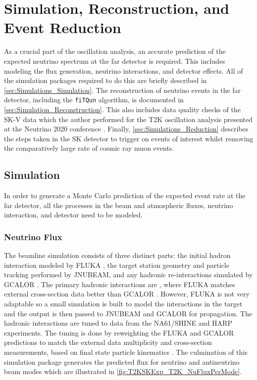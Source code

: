 \chapter{Simulation, Reconstruction, and Event Reduction}
\label{chap:Simulations}

As a crucial part of the oscillation analysis, an accurate prediction of the expected neutrino spectrum at the far detector is required. This includes modeling the flux generation, neutrino interactions, and detector effects. All of the simulation packages required to do this are briefly described in \autoref{sec:Simulations_Simulation}. The reconstruction of neutrino events in the far detector, including the \texttt{fiTQun} algorithm, is documented in \autoref{sec:Simulation_Reconstruction}. This also includes data quality checks of the SK-V data which the author performed for the T2K oscillation analysis presented at the Neutrino 2020 conference \cite{Dunne2020-uf}. Finally, \autoref{sec:Simulations_Reduction} describes the steps taken in the SK detector to trigger on events of interest whilst removing the comparatively large rate of cosmic ray muon events.

\section{Simulation}
\label{sec:Simulations_Simulation}

In order to generate a Monte Carlo prediction of the expected event rate at the far detector, all the processes in the beam and atmospheric fluxes, neutrino interaction, and detector need to be modeled. %

\subsection{Neutrino Flux}

The beamline simulation consists of three distinct parts: the initial hadron interaction modeled by FLUKA \cite{fluka2011}, the target station geometry and particle tracking performed by JNUBEAM, \cite{geant3, PhysRevD.87.012001} and any hadronic re-interactions simulated by GCALOR \cite{gcalor}. The primary hadronic interactions are , where FLUKA matches external cross-section data better than GCALOR \cite{t2k_tn_flux}. However, FLUKA is not very adaptable so a small simulation is built to model the interactions in the target and the output is then passed to JNUBEAM and GCALOR for propagation. The hadronic interactions are tuned to data from the NA61/SHINE \cite{Abgrall_2011, Abgrall_2012, NA61_pions_rep} and HARP \cite{harp} experiments. The tuning is done by reweighting the FLUKA and GCALOR predictions to match the external data multiplicity and cross-section measurements, based on final state particle kinematics \cite{t2k_tn_flux}. The culmination of this simulation package generates the predicted flux for neutrino and antineutrino beam modes which are illustrated in \autoref{fig:T2KSKExp_T2K_NuFluxPerMode}.

